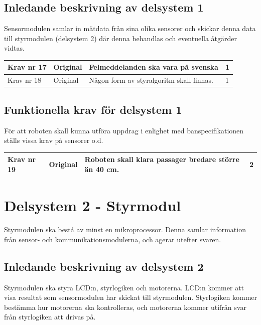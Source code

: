 \documentclass[11pt]{article}
\begin{document}
\begin{flushleft}
\subsection{Inledande beskrivning av delsystem 1}
Sensormodulen samlar in mätdata från sina olika sensorer och skickar denna data till styrmodulen (delsystem 2) där denna behandlas och eventuella åtgärder vidtas.

\begin{center}
\begin{longtable}{|l|l|p{.70\linewidth}|l|} \hline

Krav nr 17 &
Original &
Felmeddelanden ska vara på svenska &
1 \\ \hline

Krav nr 18 & 
Original &
Någon form av styralgoritm skall finnas. &
1 \\ \hline


\end{longtable}
\end{center}

\subsection{Funktionella krav för delsystem 1}
För att roboten skall kunna utföra uppdrag i enlighet med banspecifikationen ställs vissa krav på sensorer o.d.

\begin{center}
\begin{longtable}{|l|l|p{.70\linewidth}|l|} \hline

Krav nr 19 &
Original &
Roboten skall klara passager bredare större än 40 cm. &
2 \\ \hline

\end{longtable}
\end{center}


\section{Delsystem 2 - Styrmodul}
Styrmodulen ska bestå av minst en mikroprocessor.  Denna samlar information från sensor- och kommunikationsmodulerna, och agerar utefter svaren.


\subsection{Inledande beskrivning av delsystem 2}
Styrmodulen ska styra LCD:n, styrlogiken och motorerna.
LCD:n kommer att visa resultat som sensormodulen har skickat till styrmodulen. Styrlogiken kommer bestämma hur motorerna ska kontrolleras, och motorerna kommer utifrån svar från styrlogiken att drivas på.


\end{flushleft}
\end{document}
